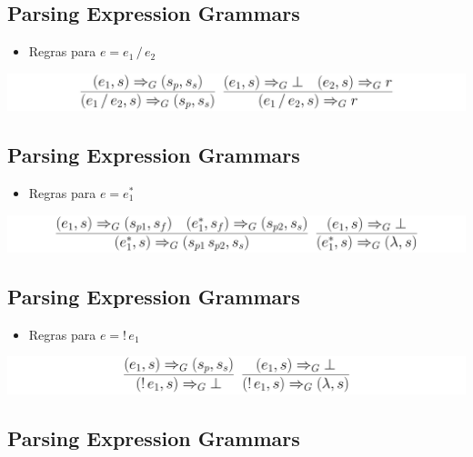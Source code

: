 \documentclass[11pt]{article}
\begin{document}
\subsection*{Parsing Expression Grammars}
\label{sec:orgf1b30f0}

\begin{itemize}
\item Regras para \(e = e_1\,/\,e_2\)
\end{itemize}


\begin{center}
\includegraphics[width=.9\linewidth]{./imgs/image5.png}
\end{center}
\subsection*{Parsing Expression Grammars}
\label{sec:org83293e0}

\begin{itemize}
\item Regras para \(e = e_1^{*}\)
\end{itemize}


\begin{center}
\includegraphics[width=.9\linewidth]{./imgs/image6.png}
\end{center}
\subsection*{Parsing Expression Grammars}
\label{sec:org6eb0187}

\begin{itemize}
\item Regras para \(e = !\,e_1\)
\end{itemize}


\begin{center}
\includegraphics[width=.9\linewidth]{./imgs/image7.png}
\end{center}
\subsection*{Parsing Expression Grammars}
\label{sec:orgd5c17e2}
\end{document}
